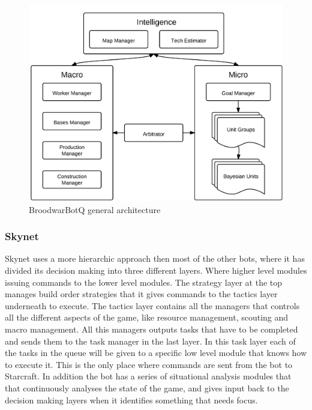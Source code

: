 
\begin{figure}[h!tbp]
\centering
\includegraphics[scale=0.8]{graphics/bbq.png}
\caption{BroodwarBotQ general architecture}
\label{fig:bthaiarch}
\end{figure}

\subsubsection{Skynet}
Skynet uses a more hierarchic approach then most of the other bots, where it has divided its decision making into three different layers. Where higher level modules issuing commands to the lower level modules. The strategy layer at the top manages build order strategies that it gives commands to the tactics layer underneath to execute. The tactics layer contains all the managers that controls all the different aspects of the game, like resource management, scouting and macro management. All this managers outputs tasks that have to be completed and sends them to the task manager in the last layer. In this task layer each of the tasks in the queue will be given to a specific low level module that knows how to execute it. This is the only place where commands are sent from the bot to Starcraft. In addition the bot has a series of situational analysis modules that that continuously analyses the state of the game, and gives input back to the decision making layers when it identifies something that needs focus.


